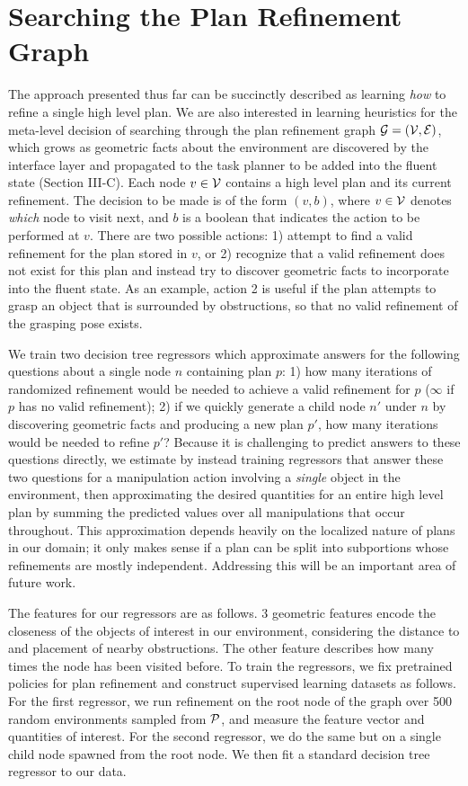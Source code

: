 \section{Searching the Plan Refinement Graph}
The approach presented thus far can be succinctly described as learning \emph{how} to
refine a single high level plan. We are also interested in learning heuristics for the
meta-level decision of searching through the plan refinement graph $\mathcal{G} = (\mathcal{V}, \mathcal{E})$, which grows as geometric
facts about the environment are discovered by the interface layer and propagated to the
task planner to be added into the fluent state (Section III-C). Each node $v \in \mathcal{V}$ contains a high level plan and its current
refinement. The decision to be made is of the form $(v, b)$,
where $v \in \mathcal{V}$ denotes \emph{which} node to visit next, and $b$ is a boolean that indicates the action
to be performed at $v$. There are two possible actions: 1) attempt to find a valid refinement
for the plan stored in $v$, or 2) recognize that a valid refinement does not exist for this plan
and instead try to discover geometric facts to incorporate into the fluent state. As an example, action 2
is useful if the plan attempts to grasp an object that is surrounded by obstructions,
so that no valid refinement of the grasping pose exists.

We train two decision tree regressors which approximate answers for the
following questions about a single node $n$ containing plan $p$: 1) how many iterations of randomized refinement
would be needed to achieve a valid refinement for $p$ ($\infty$ if $p$ has no valid refinement); 2)
if we quickly generate a child node $n'$ under $n$ by discovering geometric facts and producing a new plan $p'$,
how many iterations would be needed to refine $p'$? Because it is challenging to predict answers to these questions
directly, we estimate by instead training regressors that answer these two questions for a manipulation
action involving a \emph{single} object in the environment, then approximating the desired quantities for an entire high
level plan by summing the predicted values over all manipulations that occur throughout. This approximation
depends heavily on the localized nature of plans in our domain; it only makes sense if a plan can be split
into subportions whose refinements are mostly independent. Addressing this will be an important area of future
work.

The features for our regressors are as follows. 3 geometric features encode the closeness of the objects
of interest in our environment, considering the distance to and placement of nearby obstructions. The other
feature describes how many times the node has been visited before. To train the regressors, we fix pretrained
policies for plan refinement and construct supervised learning datasets as follows.
For the first regressor, we run refinement on the root
node of the graph over 500 random environments sampled from $\mathcal{P}$, and measure the feature vector and quantities of interest.
For the second regressor, we do the same but on a single child node spawned from the root node.
We then fit a standard decision tree regressor to our data.

